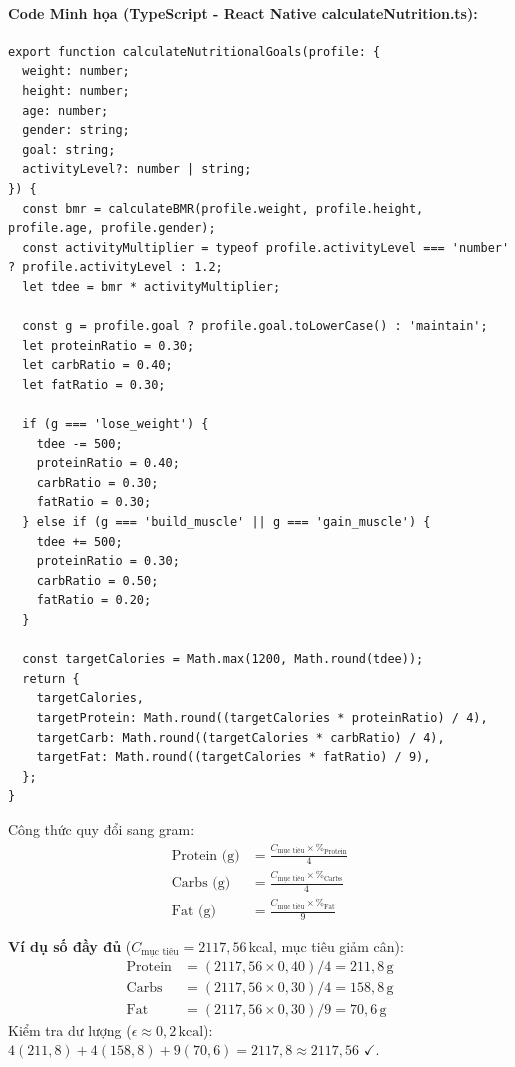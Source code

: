 \documentclass[12pt,a4paper]{article}
\begin{document}
\paragraph{Code Minh họa (TypeScript - React Native calculateNutrition.ts):}
\begin{verbatim}
export function calculateNutritionalGoals(profile: {
  weight: number;
  height: number;
  age: number;
  gender: string;
  goal: string;
  activityLevel?: number | string;
}) {
  const bmr = calculateBMR(profile.weight, profile.height, profile.age, profile.gender);
  const activityMultiplier = typeof profile.activityLevel === 'number' ? profile.activityLevel : 1.2;
  let tdee = bmr * activityMultiplier;

  const g = profile.goal ? profile.goal.toLowerCase() : 'maintain';
  let proteinRatio = 0.30;
  let carbRatio = 0.40;
  let fatRatio = 0.30;

  if (g === 'lose_weight') {
    tdee -= 500;
    proteinRatio = 0.40;
    carbRatio = 0.30;
    fatRatio = 0.30;
  } else if (g === 'build_muscle' || g === 'gain_muscle') {
    tdee += 500;
    proteinRatio = 0.30;
    carbRatio = 0.50;
    fatRatio = 0.20;
  }

  const targetCalories = Math.max(1200, Math.round(tdee));
  return {
    targetCalories,
    targetProtein: Math.round((targetCalories * proteinRatio) / 4),
    targetCarb: Math.round((targetCalories * carbRatio) / 4),
    targetFat: Math.round((targetCalories * fatRatio) / 9),
  };
}
\end{verbatim}

Công thức quy đổi sang gram:
\begin{align}
    \text{Protein (g)} &= \frac{C_{\text{mục tiêu}} \times \%_{\text{Protein}}}{4} \\[6pt]
    \text{Carbs (g)}   &= \frac{C_{\text{mục tiêu}} \times \%_{\text{Carbs}}}{4} \\[6pt]
    \text{Fat (g)}     &= \frac{C_{\text{mục tiêu}} \times \%_{\text{Fat}}}{9}
\end{align}

\noindent\textbf{Ví dụ số đầy đủ} ($C_{\text{mục tiêu}} = 2117{,}56$\,kcal, mục tiêu giảm cân):
\begin{align}
    \text{Protein} &= (2117{,}56 \times 0{,}40) / 4 = 211{,}8\,\text{g} \\[4pt]
    \text{Carbs}   &= (2117{,}56 \times 0{,}30) / 4 = 158{,}8\,\text{g} \\[4pt]
    \text{Fat}     &= (2117{,}56 \times 0{,}30) / 9 = 70{,}6\,\text{g}
\end{align}
Kiểm tra dư lượng ($\epsilon \approx 0{,}2\,\text{kcal}$): $4(211{,}8) + 4(158{,}8) + 9(70{,}6) = 2117{,}8 \approx 2117{,}56$ $\checkmark$.
\end{document}
